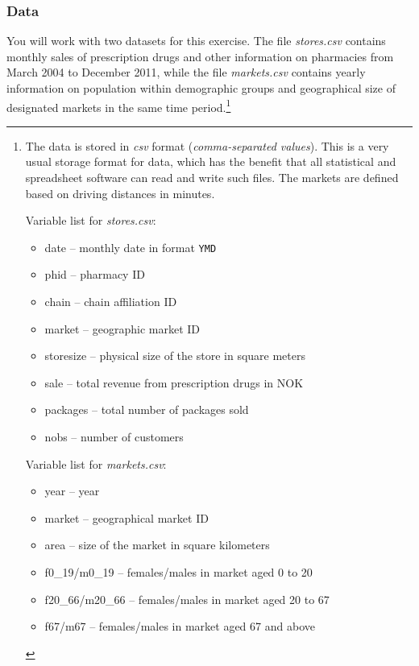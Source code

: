 \documentclass[12pt,a4paper]{article}
\begin{document}
\subsubsection*{Data}
You will work with two datasets for this exercise. The file \emph{stores.csv} contains monthly sales of prescription drugs and other information on pharmacies from March 2004 to December 2011, while the file \emph{markets.csv} contains yearly information on population within demographic groups and geographical size of designated markets in the same time period.\footnote{The data is stored in \emph{csv} format (\emph{comma-separated values}). This is a very usual storage format for data, which has the benefit that all statistical and spreadsheet software can read and write such files. The markets are defined based on driving distances in minutes.

\vspace{10pt}
Variable list for \emph{stores.csv}:
\begin{itemize}
 \item date -- monthly date in format \texttt{YMD}
 \item phid -- pharmacy ID
 \item chain -- chain affiliation ID
 \item market -- geographic market ID
 \item storesize -- physical size of the store in square meters
 \item sale -- total revenue from prescription drugs in NOK
 \item packages -- total number of packages sold
 \item nobs -- number of customers
\end{itemize}

\vspace{10pt}
Variable list for \emph{markets.csv}:
\begin{itemize}
 \item year -- year
 \item market -- geographical market ID
 \item area -- size of the market in square kilometers
 \item f0\_19/m0\_19 -- females/males in market aged 0 to 20
 \item f20\_66/m20\_66 -- females/males in market aged 20 to 67
 \item f67/m67 -- females/males in market aged 67 and above
\end{itemize}

\pagebreak

}
\end{document}
